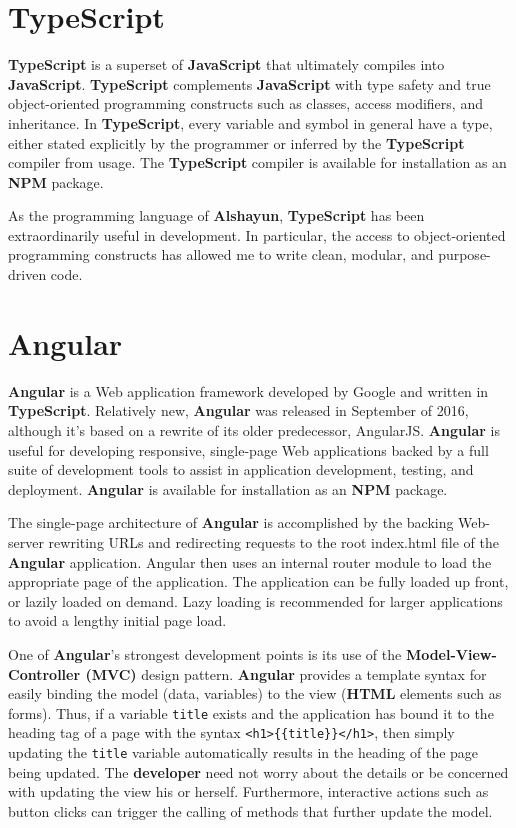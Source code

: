 \documentclass[12pt]{report}
\begin{document}
    \section{TypeScript}

\textbf{TypeScript} \cite{typescript} is a superset of \textbf{JavaScript} that
ultimately compiles into \textbf{JavaScript}. \textbf{TypeScript} complements
\textbf{JavaScript} with type safety and true object-oriented programming
constructs such as classes, access modifiers, and inheritance. In
\textbf{TypeScript}, every variable and symbol in general have a type, either
stated explicitly by the programmer or inferred by the \textbf{TypeScript}
compiler from usage. The \textbf{TypeScript} compiler is available for
installation as an \textbf{NPM} package.

As the programming language of \textbf{Alshayun}, \textbf{TypeScript} has been
extraordinarily useful in development. In particular, the access to
object-oriented programming constructs has allowed me to write clean, modular,
and purpose-driven code.

    \section{Angular}

\textbf{Angular} \cite{angular} is a Web application framework developed by
Google and written in \textbf{TypeScript}.  Relatively new, \textbf{Angular} was
released in September of 2016, although it's based on a rewrite of its older
predecessor, AngularJS. \textbf{Angular} is useful for developing responsive,
single-page Web applications backed by a full suite of development tools to
assist in application development, testing, and deployment. \textbf{Angular} is
available for installation as an \textbf{NPM} package.

The single-page architecture of \textbf{Angular} is accomplished by the backing
Web-server rewriting URLs and redirecting requests to the root index\@.html file
of the \textbf{Angular} application. Angular then uses an internal router module
to load the appropriate page of the application. The application can be fully
loaded up front, or lazily loaded on demand. Lazy loading is recommended for
larger applications to avoid a lengthy initial page load.

One of \textbf{Angular}'s strongest development points is its use of the
\textbf{Model-View-Controller (MVC)} design pattern. \textbf{Angular} provides a
template syntax for easily binding the model (data, variables) to the view
(\textbf{HTML} elements such as forms). Thus, if a variable \texttt{title}
exists and the application has bound it to the heading tag of a page with the
syntax \texttt{<h1>\{\{title\}\}</h1>}, then simply updating the \texttt{title}
variable automatically results in the heading of the page being updated. The
\textbf{developer} need not worry about the details or be concerned with
updating the view his or herself. Furthermore, interactive actions such as
button clicks can trigger the calling of methods that further update the model.
    
\end{document}
